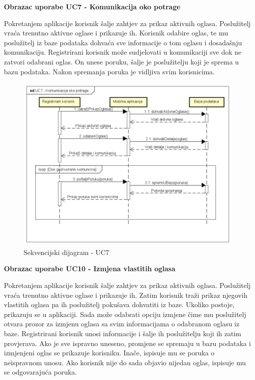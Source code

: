 				\textbf{Obrazac uporabe UC7 - Komunikacija oko potrage}

				Pokretanjem aplikacije korisnik šalje zahtjev za prikaz aktivnih oglasa. Poslužitelj vraća trenutno aktivne oglase i prikazuje ih. Korisnik odabire oglas, te mu poslužitelj iz baze podataka dohvaća sve informacije o tom oglasu i dosadašnju komunikaciju. Registrirani korisnik može sudjelovati u komunikaciji sve dok ne zatvori odabrani oglas. On unese poruku, šalje je poslužitelju koji je sprema u bazu podataka. Nakon spremanja poruka je vidljiva svim korisnicima.

					\begin{figure}[H]
						\includegraphics[scale=0.65]{dijagrami/sekvencijskiDijagrami/sd7} %
						\centering
						\caption{Sekvencijski dijagram - UC7}
						\label{fig:sDijagram7}
					\end{figure}

				\textbf{Obrazac uporabe UC10 - Izmjena vlastitih oglasa}

				Pokretanjem aplikacije korisnik šalje zahtjev za prikaz aktivnih oglasa. Poslužitelj vraća trenutno aktivne oglase i prikazuje ih. Zatim korisnik traži prikaz njegovih vlastitih oglasa pa ih poslužitelj pokušava dohvatiti iz baze. Ukoliko postoje, prikazuju se u aplikaciji. Sada može odabrati opciju izmjene čime mu poslužitelj otvara prozor za izmjenu oglasa sa svim informacijama o odabranom oglasu iz baze. Registrirani korisnik unosi informacije i šalje ih poslužitelju koji ih zatim provjerava. Ako je sve ispravno uneseno, promjene se spremaju u bazu podataka i izmjenjeni oglas se prikazuje korisniku. Inače, ispisuje mu se poruka o neispravnom unosu. Ako korisnik nije do sada objavio nijedan oglas, ispisuje mu se odgovarajuća poruka.

